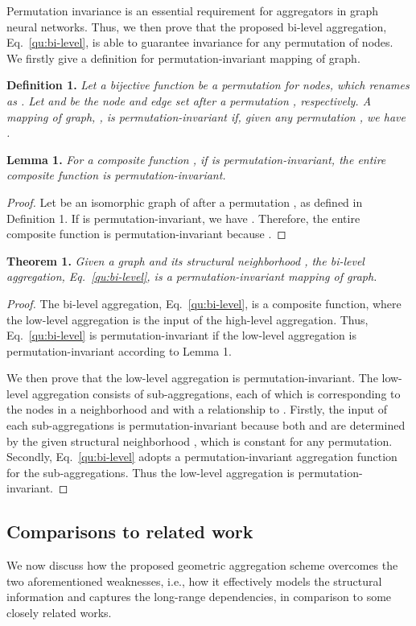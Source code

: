 \documentclass{article} \usepackage{iclr2020_conference,times}
\begin{document}
Permutation invariance is an essential requirement for aggregators in graph neural networks. 
Thus, we then prove that the proposed bi-level aggregation, Eq.~\ref{qu:bi-level}, is able to guarantee invariance for any permutation of nodes.
We firstly give a definition for permutation-invariant mapping of graph.

\textbf{Definition 1.} \emph{Let a bijective function  be a permutation for nodes, which renames  as . 
Let  and  be the node and edge set after a permutation , respectively.
A mapping of graph, , is permutation-invariant if, given any permutation , we have .}

\textbf{Lemma 1.} \emph{For a composite function , if  is permutation-invariant, the entire composite function  is permutation-invariant.}
\begin{proof}

Let  be an isomorphic graph of  after a permutation , as defined in Definition 1.
If  is permutation-invariant, we have . 
Therefore, the entire composite function  is permutation-invariant because .
\end{proof}
\vspace{-2.5mm}

\textbf{Theorem 1.} \emph{Given a graph  and its structural neighborhood , the bi-level aggregation, Eq.~\ref{qu:bi-level}, is a permutation-invariant mapping of graph.}
\vspace{-3mm}
\begin{proof}
The bi-level aggregation, Eq.~\ref{qu:bi-level}, is a composite function, where the low-level aggregation is the input of the high-level aggregation.
Thus, Eq.~\ref{qu:bi-level} is permutation-invariant if the low-level aggregation is permutation-invariant according to Lemma 1. 

We then prove that the low-level aggregation is permutation-invariant.
The low-level aggregation consists of   sub-aggregations, each of which is corresponding to the nodes in a neighborhood  and with a relationship  to .
Firstly, the input of each sub-aggregations is permutation-invariant because both  and  are determined by the given structural neighborhood , which is constant for any permutation. 
Secondly, Eq.~\ref{qu:bi-level} adopts a permutation-invariant aggregation function  for the sub-aggregations.
Thus the low-level aggregation is permutation-invariant.
\vspace{-2mm}
\end{proof}


\subsection{Comparisons to related work}
\vspace{-2mm}
We now discuss how the proposed geometric aggregation scheme overcomes the two aforementioned weaknesses, i.e., how it effectively models the structural information and captures the long-range dependencies, in comparison to some closely related works.  
\end{document}
